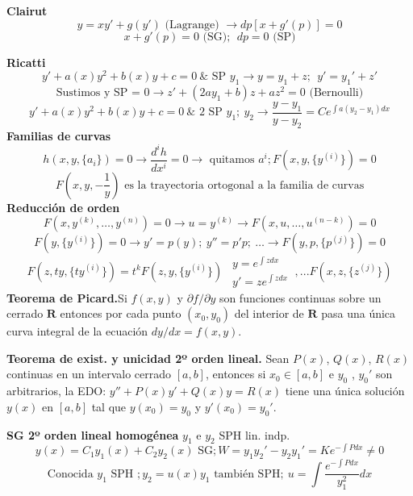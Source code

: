 \documentclass[10pt,landscape,letterpaper]{article}
\begin{document}
\begin{multicols}{3}
\textbf{Clairut}
\vspace{-8pt}
\[y=xy'+g(y') \mbox{ (Lagrange) }  \rightarrow dp [x+g'(p)]=0\]
\[x+g'(p) = 0 \mbox{ (SG)}; \ \ dp = 0 \mbox{ (SP)}\]
\vspace{-19pt}

\textbf{Ricatti}
\vspace{-5pt}
\[y' + a(x)y^2+b(x)y+c=0 \ \& \mbox{ SP } y_1 \rightarrow y = y_1 +z; \ \ y' = y_1'+z' \]
\[\mbox{Sustimos y SP = 0} \rightarrow \boxed{z'+(2a y_1 +b)z +az^2=0} \mbox{ (Bernoulli)}\]
\[y' + a(x)y^2+b(x)y+c=0 \ \& \mbox{ 2 SP } y_1; \ y_2 \rightarrow \boxed{\frac{y-y_1}{y-y_2}=Ce^{\int{a(y_2-y_1)dx}}}\]
\textbf{Familias de curvas}
\vspace{-9pt}
\[h(x,y,\{a_i\})=0 \rightarrow \frac{d^i h}{dx^i} =0 \rightarrow \mbox{ quitamos } {a^i};  F\left(x,y,\{y^{(i)}\}\right)=0\]
\vspace{-10pt}
\[F\left(x,y,-\frac{1}{y}\right) \mbox{ es la trayectoria ortogonal a la familia de curvas}\]
\textbf{Reducción de orden}
\[F(x,y^{(k)},\dots,y^{(n)})=0\rightarrow u=y^{(k)} \rightarrow F(x,u,\dots,u^{(n-k)})=0\]
\[F(y,\{y^{(i)}\})=0 \rightarrow y'=p(y); \ y''=p'p; \  \dots \rightarrow F(y,p,\{p^{(j)}\})=0\]
\[F(z,ty,\{ty^{(i)}\})=t^k F(z,y,\{y^{(i)}\}) \ \ \begin{matrix}
  y=e^{\int{z dx}} \\ y'=z e^{\int{z dx}}
\end{matrix} \ , ... F(x,z,\{z^{(j)}\})\]
\textbf{Teorema de Picard.}Si $f(x,y)$ y $\partial f / \partial y$ son funciones continuas sobre un cerrado $\mathbf{R}$ entonces por cada punto $(x_0,y_0)$ del interior de $\mathbf{R}$ pasa una única curva integral de la ecuación $dy/dx = f(x,y)$.

\textbf{Teorema de exist. y unicidad 2º orden lineal.} Sean $P(x)$, $Q(x)$, $R(x)$ continuas en un intervalo cerrado $[a,b]$, entonces si $x_0 \in [a, b]$ e $y_0$ , $y_0'$ son arbitrarios, la EDO: $y'' +P(x)y' +Q(x)y = R(x)$ tiene una única solución $y(x)$ en $[a, b]$ tal que $y(x_0) = y_0$ y $y'(x_0) = y_0'$.

\textbf{SG 2º orden lineal homogénea}
$y_1$ e $y_2$ SPH lin. indp.
\vspace{-5pt}
\[y(x)=C_1 y_1(x)+C_2 y_2(x) \mbox{ SG}; W=y_1 y_2' - y_2 y_1'=K e^{-\int{P dx}} \neq 0\]
\vspace{-15pt}
\[\mbox{Conocida } y_1 \mbox{ SPH }; y_2=u(x)y_1 \mbox{ también SPH}; \ u=\int{\frac{e^{-\int{P dx}}}{y_1^2}dx}\]
\vspace{-10pt}


\end{multicols}
\end{document}

